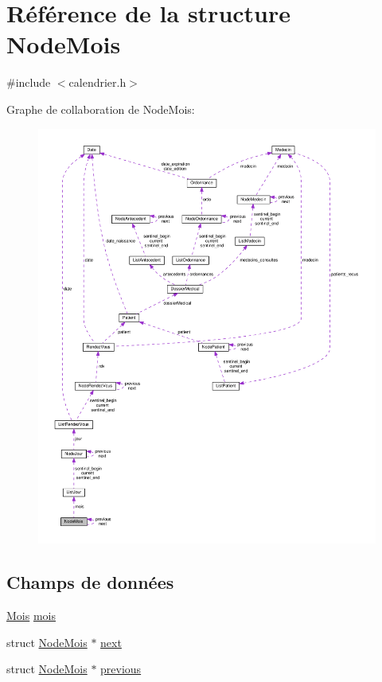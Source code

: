 \hypertarget{struct_node_mois}{\section{Référence de la structure Node\-Mois}
\label{struct_node_mois}
}


{\ttfamily \#include $<$calendrier.\-h$>$}



Graphe de collaboration de Node\-Mois\-:
\nopagebreak
\begin{figure}[H]
\begin{center}
\leavevmode
\includegraphics[width=350pt]{struct_node_mois__coll__graph}
\end{center}
\end{figure}
\subsection*{Champs de données}
\begin{DoxyCompactItemize}
\item 
\hyperlink{calendrier_8h_ae3a97c3f15c38f94baef498c511b4258}{Mois} \hyperlink{struct_node_mois_ab849c15d22d8cdd9c32d94bfc37033eb}{mois}
\item 
struct \hyperlink{struct_node_mois}{Node\-Mois} $\ast$ \hyperlink{struct_node_mois_a91a0a35c8966de2862bf897c1c914b3e}{next}
\item 
struct \hyperlink{struct_node_mois}{Node\-Mois} $\ast$ \hyperlink{struct_node_mois_a9c424087093e46294bf21e09595ca6e0}{previous}
\end{DoxyCompactItemize}


